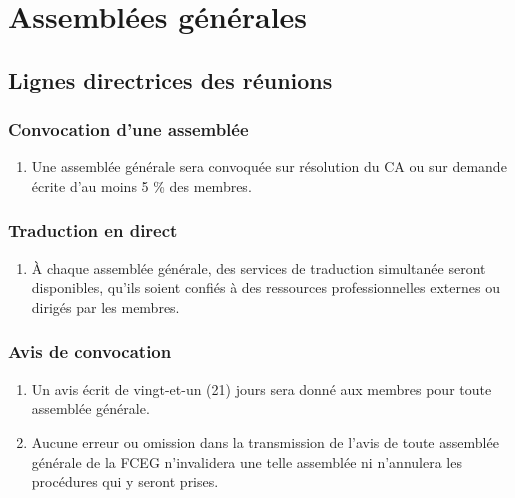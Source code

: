 \section{Assemblées générales}
\label{assemblees-generales}

\subsection{Lignes directrices des réunions}
\label{assemblees-generales-lignes-directrices-des-reunions}

\subsubsection{Convocation d'une assemblée}
\label{lignes-directrices-des-reunions-convocation-d-une-assemblee}

\begin{enumerate}
 \item Une assemblée générale sera convoquée sur résolution du CA ou sur demande écrite d'au moins 5 \% des membres.
\end{enumerate}

\subsubsection{Traduction en direct}
\label{lignes-directrices-des-reunions-traduction-en-direct}

\begin{enumerate}
 \item À chaque assemblée générale, des services de traduction simultanée seront disponibles, qu'ils soient confiés à des ressources professionnelles externes ou dirigés par les membres.
\end{enumerate}

\subsubsection{Avis de convocation}
\label{lignes-directrices-des-reunions-avis-de-convocation}

\begin{enumerate}
 \item Un avis écrit de vingt-et-un (21) jours sera donné aux membres pour toute assemblée générale.
 \item Aucune erreur ou omission dans la transmission de l'avis de toute assemblée générale de la FCEG n'invalidera une telle assemblée ni n'annulera les procédures qui y seront prises.
\end{enumerate}

